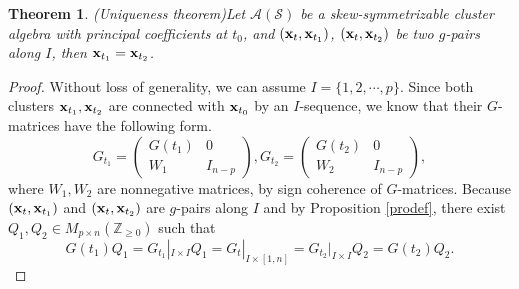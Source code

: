 \documentclass[14pt]{amsart}
\newtheorem{Theorem}{Theorem}[section]
\begin{document}
\begin{Theorem}(Uniqueness theorem)\label{thmunique}
Let  $\mathcal A(\mathcal S)$ be a skew-symmetrizable cluster algebra  with principal coefficients at $t_0$, and $({\bf x}_t,{\bf x}_{t_1})$, $({\bf x}_t,{\bf x}_{t_2})$ be two $g$-pairs along $I$, then ${\bf x}_{t_1}={\bf x}_{t_2}$.
\end{Theorem}
\begin{proof}
Without loss of generality, we can assume $I=\{1,2,\cdots,p\}$. Since both clusters ${\bf x}_{t_1},{\bf x}_{t_2}$ are connected with ${\bf x}_{t_0}$ by an $I$-sequence, we know that their $G$-matrices have the following form.
$$G_{t_1}=\begin{pmatrix}G(t_1)&0\\ W_1 &I_{n-p}\end{pmatrix}, G_{t_2}=\begin{pmatrix}G(t_2)&0\\ W_2&I_{n-p}\end{pmatrix},$$
where  $W_1, W_2$ are nonnegative matrices, by sign coherence of $G$-matrices.
Because $({\bf x}_t,{\bf x}_{t_1})$ and $({\bf x}_t,{\bf x}_{t_2})$ are $g$-pairs along $I$ and by Proposition \ref{prodef}, there exist $Q_1,Q_2\in M_{p\times n}(\mathbb Z_{\geq0})$ such that $$G(t_1)Q_1=G_{t_1}|_{I\times I}Q_1=G_t|_{I\times [1,n]}=G_{t_2}|_{I\times I}Q_2=G(t_2)Q_2.$$


\end{proof}
\end{document}
